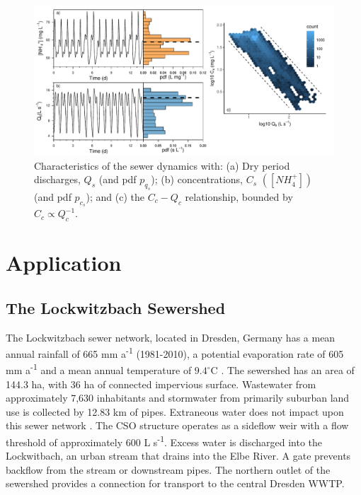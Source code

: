 \documentclass[draft,linenumbers]{agujournal2018}
\begin{document}
 \begin{figure}[ht]
 \centering
\includegraphics[width=30pc]{Fig3.pdf}
\caption{Characteristics of the sewer dynamics with: (a) Dry period discharges, $Q_s$ (and pdf $p_{q_s}$); (b) concentrations, $C_s$ $([NH_4^+])$ (and pdf $p_{c_s}$); and (c) the $C_c-Q_c$ relationship, bounded by $C_c \propto Q_c^{-1}$.}
 \label{figfour}
 \end{figure}


\section{Application}
\subsection{The Lockwitzbach Sewershed}
The Lockwitzbach sewer network, located in Dresden, Germany has a mean annual rainfall of 665 mm a\textsuperscript{-1} (1981-2010), a potential evaporation rate of 605 mm a\textsuperscript{-1} and a mean annual temperature of $9.4^\circ$C \citep{DWetter}. The sewershed has an area of 144.3 ha, with 36 ha of connected impervious surface. Wastewater from approximately 7,630 inhabitants and stormwater from primarily suburban land use is collected by 12.83 km of pipes. Extraneous water does not impact upon this sewer network \cite{Karpf_2011}. The CSO structure operates as a sidef\/low weir with a f\/low threshold of approximately 600 L s\textsuperscript{-1}. Excess water is discharged into the Lockwitbach, an urban stream that drains into the Elbe River. A gate prevents backf\/low from the stream or downstream pipes. The northern outlet of the sewershed provides a connection for transport to the central Dresden WWTP. 
\end{document}
